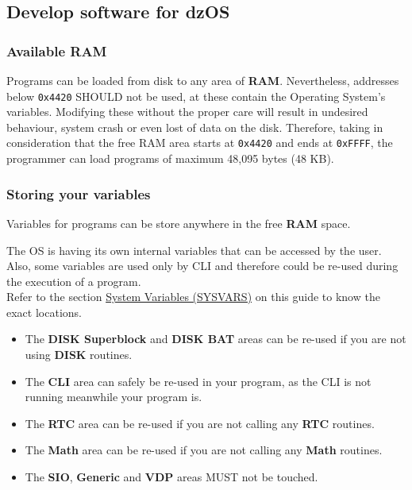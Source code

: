     \subsection{Develop software for dzOS}

        \subsubsection{Available RAM}
        Programs can be loaded from disk to any area of \textbf{RAM}. Nevertheless,
        addresses below \texttt{0x4420} SHOULD not be used, at these contain the
        Operating System's variables. Modifying these without the proper care will
        result in undesired behaviour, system crash or even lost of data on the disk.
        Therefore, taking in consideration that the free RAM area starts at
        \texttt{0x4420} and ends at \texttt{0xFFFF}, the programmer can load
        programs of maximum 48,095 bytes (48 KB).

        \subsubsection{Storing your variables}
        Variables for programs can be store anywhere in the free \textbf{RAM} space.

        The OS is having its own internal variables that can be accessed by the user.
        Also, some variables are used only by CLI and therefore could be re-used
        during the execution of a program.\\

        Refer to the section \hyperref[sec:ram_memmap]{System Variables (SYSVARS)}
        on this guide to know the exact locations.

        \begin{itemize}
            \item The \textbf{DISK Superblock} and \textbf{DISK BAT} areas can be
            re-used if you are not using \textbf{DISK} routines.
            \item The \textbf{CLI} area can safely be re-used in your program, as
            the CLI is not running meanwhile your program is.
            \item The \textbf{RTC} area can be re-used if you are not calling any
            \textbf{RTC} routines.
            \item The \textbf{Math} area can be re-used if you are not calling any
            \textbf{Math} routines.
            \item The \textbf{SIO}, \textbf{Generic} and \textbf{VDP} areas MUST not
            be touched.
        \end{itemize}

